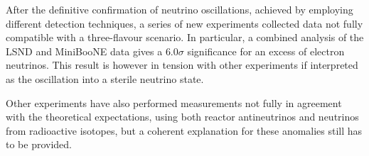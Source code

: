 \vspace{1em}

After the definitive confirmation of neutrino oscillations, achieved by employing different detection techniques, a series of new experiments collected data not fully compatible with a three-flavour scenario. In particular, a combined analysis of the LSND and MiniBooNE data gives a $6.0\sigma$ significance for an excess of electron neutrinos. This result is however in tension with other experiments if interpreted as the oscillation into a sterile neutrino state. 

Other experiments have also performed measurements not fully in agreement with the theoretical expectations, using both reactor antineutrinos and neutrinos from radioactive isotopes, but a coherent explanation for these anomalies still has to be provided. 